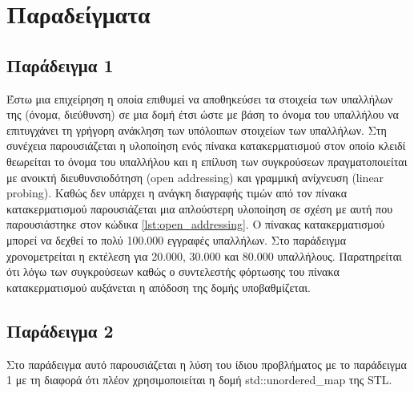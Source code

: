 \section{Παραδείγματα}

\subsection{Παράδειγμα 1}
Έστω μια επιχείρηση η οποία επιθυμεί να αποθηκεύσει τα στοιχεία των υπαλλήλων της (όνομα, διεύθυνση) σε μια δομή έτσι ώστε με βάση το όνομα του υπαλλήλου να επιτυγχάνει τη γρήγορη ανάκληση των υπόλοιπων στοιχείων των υπαλλήλων. Στη συνέχεια παρουσιάζεται η υλοποίηση ενός πίνακα κατακερματισμού στον οποίο κλειδί θεωρείται το όνομα του υπαλλήλου και η επίλυση των συγκρούσεων πραγματοποιείται με ανοικτή διευθυνσιοδότηση (open addressing) και γραμμική ανίχνευση (linear probing). Καθώς δεν υπάρχει η ανάγκη διαγραφής τιμών από τον πίνακα κατακερματισμού παρουσιάζεται μια απλούστερη υλοποίηση σε σχέση με αυτή που παρουσιάστηκε στον κώδικα \ref{lst:open_addressing}. Ο πίνακας κατακερματισμού μπορεί να δεχθεί το πολύ 100.000 εγγραφές υπαλλήλων. Στο παράδειγμα χρονομετρείται η εκτέλεση για 20.000, 30.000 και 80.000 υπαλλήλους. Παρατηρείται ότι λόγω των συγκρούσεων καθώς ο συντελεστής φόρτωσης του πίνακα κατακερματισμού αυξάνεται η απόδοση της δομής υποβαθμίζεται.





\subsection{Παράδειγμα 2}
Στο παράδειγμα αυτό παρουσιάζεται η λύση του ίδιου προβλήματος με το παράδειγμα 1 με τη διαφορά ότι πλέον χρησιμοποιείται η δομή std::unordered\_map της STL.





